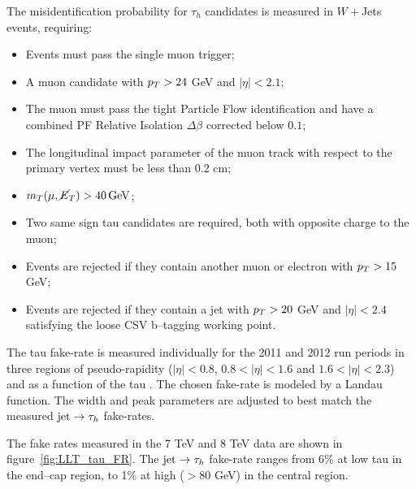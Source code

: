 The misidentification probability for $\tau_h$ candidates is measured in $W+$Jets events, requiring:
\begin{itemize}
\item Events must pass the single muon trigger;
\item A muon candidate with $p_{T} > 24$ GeV and $|\eta| < 2.1$;
\item The muon must pass the tight Particle Flow identification and have a combined PF Relative Isolation $\Delta \beta $ corrected below $0.1$;
\item The longitudinal impact parameter of the muon track with respect to the primary vertex must be less than 0.2 cm;
\item $m_{T}(\mu, \cancel{E}_T) > 40\, \mathrm{GeV}$;
\item Two same sign tau candidates are required, both with opposite charge to the muon;
\item Events are rejected if they contain another muon or electron with $p_{T} > 15$ GeV;
\item Events are rejected if they contain a jet with $p_{T} > 20$ GeV and $|\eta|< 2.4$ satisfying the loose CSV b--tagging working point.
\end{itemize}
The tau fake-rate is measured individually for the 2011 and 2012 run periods in three regions of pseudo-rapidity ($|\eta|<0.8$,
\mbox{$0.8<|\eta|<1.6$} and $1.6<|\eta|<2.3$) and as a function of the tau \pT. The chosen fake-rate is modeled by a Landau function. %
The width and peak parameters are adjusted to best match the measured $\mathrm{jet}\rightarrow\tau_h$ fake-rates.

The fake rates measured in the %
7 TeV and 8 TeV data are shown in figure~\ref{fig:LLT_tau_FR}. The $\mathrm{jet}\rightarrow\tau_h$ fake-rate %
ranges from 6\% at low tau \pT in the end--cap region, to 1\% at high \pT ($ > 80$ GeV) in the central region.

